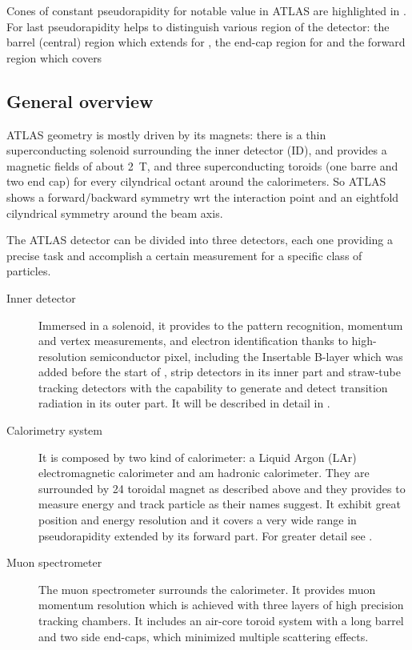 Cones of constant pseudorapidity for notable value in ATLAS are highlighted in \Fig{\ref{fig:pseudorapidita}}. For last pseudorapidity helps to distinguish various region of the detector: the barrel (central) region which extends for , the  end-cap region for  and the forward region which covers 




\subsection{General overview}
ATLAS geometry is mostly driven by its magnets: there is a thin superconducting solenoid surrounding the inner detector (ID), and provides a magnetic fields of about \SI{2}{T}, and three superconducting toroids (one barre and two end cap) for every cilyndrical octant around the calorimeters. So ATLAS shows a forward/backward symmetry wrt the interaction point and an eightfold cilyndrical symmetry around the beam axis.

The ATLAS detector can be divided into three detectors, each one providing a precise task and accomplish a certain measurement for a specific class of particles.
\begin{description}
\item[Inner detector] Immersed in a solenoid, it provides to the pattern recognition, momentum and vertex measurements, and electron identification thanks to high-resolution semiconductor pixel, including the Insertable B-layer which was added before the start of \RunTwo, strip detectors in its inner part and straw-tube tracking detectors with the capability to generate and detect transition radiation in its outer part. It will be described in detail in \Sect{\ref{sec:ID}}.
\item[Calorimetry system] It is composed by two kind of calorimeter: a Liquid Argon (LAr) electromagnetic calorimeter and am hadronic calorimeter. They are surrounded by \num{24} toroidal magnet as described above and they provides to measure energy and track particle as their names suggest. It exhibit great position and energy resolution and it covers a very wide range in pseudorapidity extended by its forward part. For greater detail see \Sect{\ref{sec:calo}}.
\item[Muon spectrometer] The muon spectrometer surrounds the calorimeter. It provides muon momentum resolution which is achieved with three layers of high precision tracking chambers. It includes an air-core toroid system with a long barrel and two side end-caps, which minimized multiple scattering effects.

\end{description}

